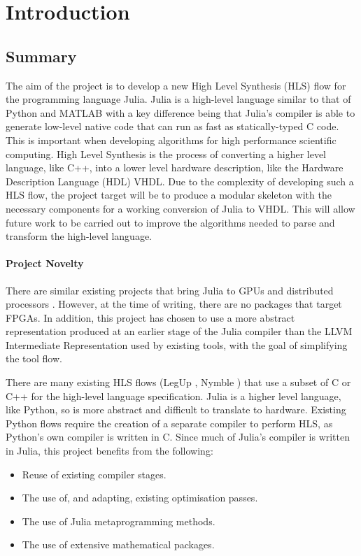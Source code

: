 \chapter{Introduction} 

\section{Summary}
The aim of the project is to develop a new High Level Synthesis (HLS) flow for the programming language Julia. Julia is a high-level language similar to that of Python and MATLAB with a key difference being that Julia's compiler is able to generate low-level native code that can run as fast as statically-typed C code. This is important when developing algorithms for high performance scientific computing. High Level Synthesis is the process of converting a higher level language, like C++, into a lower level hardware description, like the Hardware Description Language (HDL) VHDL. Due to the complexity of developing such a HLS flow, the project target will be to produce a modular skeleton with the necessary components for a working conversion of Julia to VHDL. This will allow future work to be carried out to improve the algorithms needed to parse and transform the high-level language. 

\subsubsection{Project Novelty}
There are similar existing projects that bring Julia to GPUs \cite{julia_gpu} and distributed processors \cite{julia_dist_plat}. However, at the time of writing, there are no packages that target FPGAs. In addition, this project has chosen to use a more abstract representation produced at an earlier stage of the Julia compiler than the LLVM Intermediate Representation used by existing tools, with the goal of simplifying the tool flow.

There are many existing HLS flows (LegUp \cite{legup_intro}, Nymble \cite{nymble_intro}) that use a subset of C or C++ for the high-level language specification. Julia is a higher level language, like Python, so is more abstract and difficult to translate to hardware. Existing Python flows \cite{python_hls} require the creation of a separate compiler to perform HLS, as Python's own compiler is written in C. Since much of Julia's compiler is written in Julia, this project benefits from the following:

\begin{itemize}
    \item Reuse of existing compiler stages.
    \item The use of, and adapting, existing optimisation passes.
    \item The use of Julia metaprogramming methods.
    \item The use of extensive mathematical packages.
\end{itemize}

